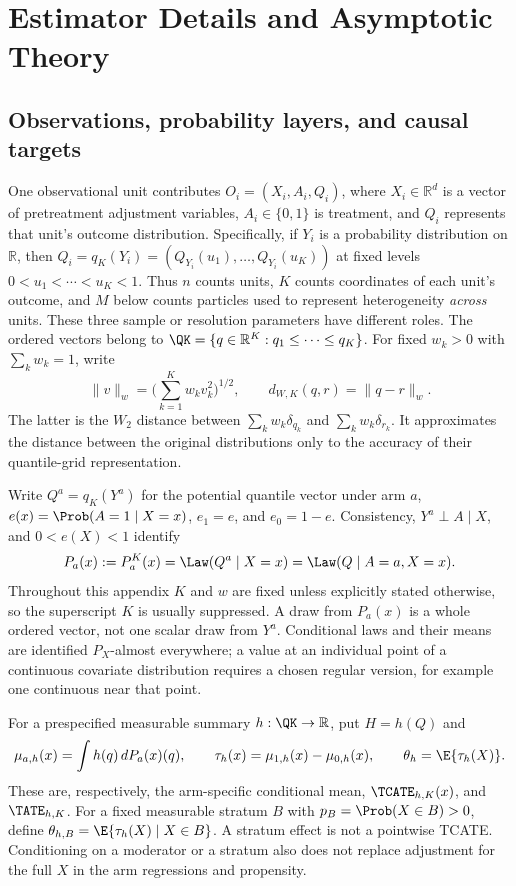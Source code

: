 \section{Estimator Details and Asymptotic Theory}\label{app:algorithm}

\subsection{Observations, probability layers, and causal targets}

One observational unit contributes $O_i=(X_i,A_i,Q_i)$, where $X_i\in\mathbb R^d$ is a vector of pretreatment adjustment variables, $A_i\in\{0,1\}$ is treatment, and $Q_i$ represents that unit's outcome distribution. Specifically, if $Y_i$ is a probability distribution on $\mathbb R$, then $Q_i=q_K(Y_i)=(Q_{Y_i}(u_1),\ldots,Q_{Y_i}(u_K))$ at fixed levels $0<u_1<\cdots<u_K<1$. Thus $n$ counts units, $K$ counts coordinates of each unit's outcome, and $M$ below counts particles used to represent heterogeneity \emph{across} units. These three sample or resolution parameters have different roles. The ordered vectors belong to $\QK=\{q\in\mathbb R^K:q_1\leq\cdots\leq q_K\}$. For fixed $w_k>0$ with $\sum_k w_k=1$, write
\[
 \|v\|_w=\Big(\sum_{k=1}^K w_kv_k^2\Big)^{1/2},\qquad
 d_{W,K}(q,r)=\|q-r\|_w.
\]
The latter is the $W_2$ distance between $\sum_k w_k\delta_{q_k}$ and $\sum_k w_k\delta_{r_k}$. It approximates the distance between the original distributions only to the accuracy of their quantile-grid representation.

Write $Q^a=q_K(Y^a)$ for the potential quantile vector under arm $a$, $e(x)=\Prob(A=1\mid X=x)$, $e_1=e$, and $e_0=1-e$. Consistency, $Y^a\perp A\mid X$, and $0<e(X)<1$ identify
\[
 P_a(x):=P_a^K(x)=\Law(Q^a\mid X=x)=\Law(Q\mid A=a,X=x).
\]
Throughout this appendix $K$ and $w$ are fixed unless explicitly stated otherwise, so the superscript $K$ is usually suppressed. A draw from $P_a(x)$ is a whole ordered vector, not one scalar draw from $Y^a$. Conditional laws and their means are identified $P_X$-almost everywhere; a value at an individual point of a continuous covariate distribution requires a chosen regular version, for example one continuous near that point.

For a prespecified measurable summary $h:\QK\to\mathbb R$, put $H=h(Q)$ and
\[
 \mu_{a,h}(x)=\int h(q)\,dP_a(x)(q),\qquad
 \tau_h(x)=\mu_{1,h}(x)-\mu_{0,h}(x),\qquad
 \theta_h=\E\{\tau_h(X)\}.
\]
These are, respectively, the arm-specific conditional mean, $\TCATE_{h,K}(x)$, and $\TATE_{h,K}$. For a fixed measurable stratum $B$ with $p_B=\Prob(X\in B)>0$, define $\theta_{h,B}=\E\{\tau_h(X)\mid X\in B\}$. A stratum effect is not a pointwise TCATE. Conditioning on a moderator or a stratum also does not replace adjustment for the full $X$ in the arm regressions and propensity.

